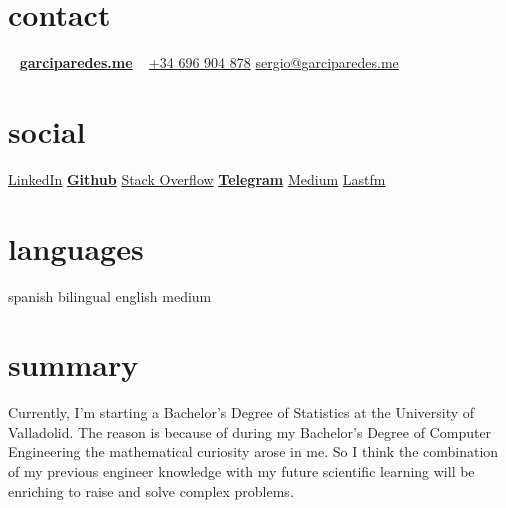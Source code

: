 \documentclass[]{friggeri-cv} %
\begin{document}


    \begin{aside} %

        \section{contact}
            ~
            \href{http://garciparedes.me}{\textbf{garciparedes.me}}
            ~
            \href{tel:+34 696 904 878}{+34 696 904 878}
            \href{mailto:sergio@garciparedes.me}{sergio@garciparedes.me}
        \section{social}
            \href{https://es.linkedin.com/in/garciparedes/en}{LinkedIn\quad\faLinkedin }
            \href{https://github.com/garciparedes}{\quad{\color{red} $\varheartsuit$}\quad\textbf{Github}\quad\faGithub }
            \href{http://stackoverflow.com/users/3921457/garciparedes}{Stack Overflow\quad\faStackOverflow }
            \href{https://telegram.me/garciparedes}{\textbf{Telegram}\quad\faPaperPlane }
            \href{https://medium.com/@garciparedes}{Medium\quad\faMedium }
            \href{https://www.last.fm/user/garciparedes/listening-report/week}{Lastfm\quad\faLastfm}
        \section{languages}
            spanish bilingual
            english medium
    \end{aside}




    \section{summary}

        Currently, I'm starting a Bachelor's Degree of Statistics at the University of Valladolid. The reason is because of during my Bachelor's Degree of Computer Engineering the mathematical curiosity arose in me. So I think the combination of my previous engineer knowledge with my future scientific learning will be enriching to raise and solve complex problems.
\end{document}
